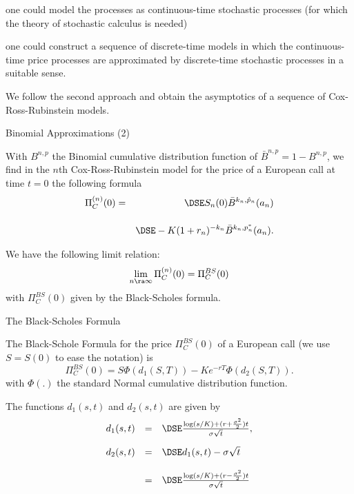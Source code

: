 	one could model the processes as
continuous-time stochastic processes (for which the theory of
stochastic calculus is needed)

	one could construct a sequence of discrete-time models in which
the continuous-time price processes are approximated by
discrete-time stochastic processes in a suitable sense.


	We follow the second approach and obtain the asymptotics
 of a sequence of Cox-Ross-Rubinstein models.


{Binomial Approximations (2)}


 With $B^{n, p}$ the Binomial cumulative distribution function of
 $\bar{B}^{n, p} = 1- B^{n, p}$, we find in the $n$th
Cox-Ross-Rubinstein model for the price of a European call at time
$t=0$ the following formula
\begin{eqnarray}\label{crrpricen}
\Pi_C^{(n)}(0) &=&\DSE S_n(0) \bar{B}^{k_n, \hat{p}_n}(a_n)\\*[12pt]\nonumber
&&\DSE- K
(1+r_n)^{-k_n} \bar{B}^{k_n, p^*_n}(a_n).
\end{eqnarray}

	We have the following limit relation:
$$
\lim_{n \ra \infty} \Pi_C^{(n)}(0) = \Pi_C^{BS}(0)
$$
with $\Pi_C^{BS}(0)$ given by the Black-Scholes formula.


{The Black-Scholes Formula}


	The Black-Schole Formula for the price $\Pi_C^{BS}(0)$ of a European call  (we use
$S=S(0)$ to ease the notation) is
\begin{equation}\label{BScallprice4}
\Pi_C^{BS}(0) = S \Phi(d_1(S, T)) - K e^{-rT} \Phi(d_2(S, T)).
\end{equation}
with $\Phi(.)$ the standard Normal cumulative distribution function.

	The functions $d_1(s,t)$ and $d_2(s,t)$ are given by
$$
\begin{array}{lll}
d_1(s,t) &=&\DSE \frac{\log(s/K) + (r +
\frac{\sigma^2}{2})t}{\sigma \sqrt{t}},\\*[12pt] d_2(s,t) &=&\DSE
d_1(s,t) -\sigma \sqrt{t}\\*[12pt]
&=&\DSE \frac{\log(s/K) + (r -
\frac{\sigma^2}{2})t}{\sigma \sqrt{t}}
\end{array}
$$

